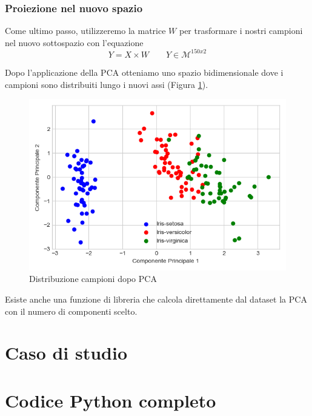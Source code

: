 \documentclass[12pt]{article}
\newcommand{\codice}[2]{}
\begin{document}
		\subsubsection{Proiezione nel nuovo spazio}
			Come ultimo passo, utilizzeremo la matrice $W$ per trasformare i nostri campioni nel nuovo sottospazio con l'equazione $$Y = X\times W \qquad Y \in \mathcal{M}^{150x2}$$
			\codice{132}{133}
			Dopo l'applicazione della \ac{PCA} otteniamo uno spazio bidimensionale dove i campioni sono distribuiti lungo i nuovi assi (Figura \ref{img:PCA}).
			\begin{figure}
				\begin{center}
					\includegraphics[scale=.5]{PCA}
					\caption{Distribuzione campioni dopo PCA}
					\label{img:PCA}
				\end{center}
			\end{figure}
			
			Esiste anche una funzione di libreria che calcola direttamente dal dataset la \ac{PCA} con il numero di componenti scelto.
			\codice{149}{151}
\section{Caso di studio}

	\lipsum[12-13]
	
\newpage
\section{Codice Python completo}
	
	\newpage
	
	\newpage
	
\end{document}

